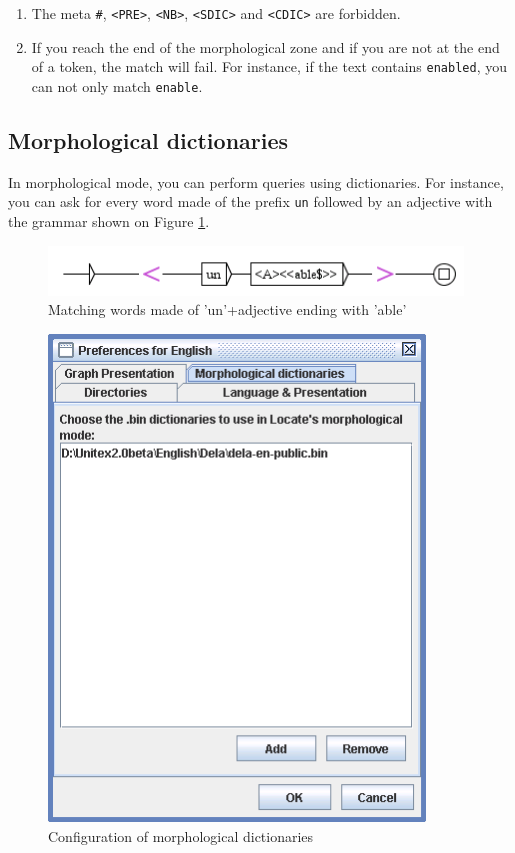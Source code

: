 \begin{enumerate}
    \item The meta \verb+#+, \verb+<PRE>+, \verb+<NB>+, 
    \verb+<SDIC>+ and \verb+<CDIC>+ are forbidden.\index{\verb+#+}
       
     
    
    \item If you reach the end of the morphological zone and if you are not
    at the end of a token, the match will fail. For instance, if the text
    contains \verb+enabled+, you can not only match \verb+enable+.
\end{enumerate}

\subsection{Morphological dictionaries}
In morphological mode, you can perform queries using dictionaries. For
instance, you can ask for every word made of the prefix \verb+un+ followed by an
adjective with the grammar shown on Figure \ref{fig-morpho3}.

\begin{figure}[!ht]
\begin{center}
\includegraphics[width=11cm]{resources/img/fig6-17m.png}
\caption{Matching words made of 'un'+adjective ending with
'able'\label{fig-morpho3}}
\end{center}
\end{figure}

\begin{figure}[!ht]
\begin{center}
\includegraphics[width=10cm]{resources/img/fig6-17n.png}
\caption{Configuration of morphological dictionaries\label{fig-morpho4}}
\end{center}
\end{figure}

